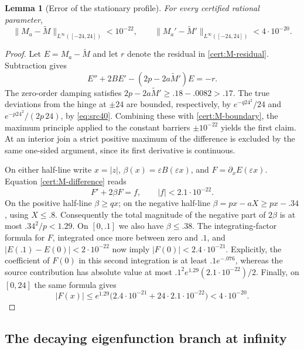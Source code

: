 \documentclass[11pt,a4paper]{article}
\numberwithin{equation}{section}
\newtheorem{lemma}[theorem]{Lemma}
\theoremstyle{definition}
\theoremstyle{remark}
\begin{document}
\begin{lemma}[Error of the stationary profile]\label{cert:M-error}
For every certified rational parameter,
\[
 \|M_a-\widetilde M\|_{L^\infty([-24,24])}<10^{-22},\qquad
 \|M_a'-\widetilde M'\|_{L^\infty([-24,24])}<4\cdot10^{-20}.
\]
\end{lemma}
\begin{proof}
Let $E=M_a-\widetilde M$ and let $r$ denote the residual in
\eqref{cert:M-residual}.  Subtraction gives
\begin{equation}\label{cert:M-difference}
 E''+2B E'-(2p-2a\widetilde M')E=-r.
\end{equation}
The zero-order damping satisfies
$2p-2a\widetilde M'\ge .18-.0082>.17$.
The true deviations from the hinge at $\pm24$ are bounded, respectively, by
$e^{-q24^2}/24$ and $e^{-p24^2}/(2p\,24)$, by
\eqref{eq:src40}.  Combining these with \eqref{cert:M-boundary}, the maximum
principle applied to the constant barriers $\pm10^{-22}$ yields the first
claim.  At an interior join a strict positive maximum of the difference is
excluded by the same one-sided argument, since its first derivative is
continuous.

On either half-line write $x=|z|$, $\beta(x)=\varepsilon B(\varepsilon x)$,
and $F=\partial_xE(\varepsilon x)$.  Equation
\eqref{cert:M-difference} reads
\[
 F'+2\beta F=f,\qquad |f|<2.1\cdot10^{-22}.
\]
On the positive half-line $\beta\ge qx$; on the negative half-line
$\beta=px-aX\ge px-.34$, using $X\le .8$.
Consequently the total magnitude of the negative part of $2\beta$ is at most
$.34^2/p<1.29$.  On $[0,.1]$ we also have $\beta\le .38$.
The integrating-factor formula for $F$, integrated once more between zero and
$.1$, and $|E(.1)-E(0)|<2\cdot10^{-22}$ now imply
$|F(0)|<2.4\cdot10^{-21}$.  Explicitly, the coefficient of $F(0)$ in this
second integration is at least $.1e^{-.076}$, whereas the source contribution
has absolute value at most
$.1^2e^{1.29}(2.1\cdot10^{-22})/2$.
Finally, on $[0,24]$ the same formula gives
\[
 |F(x)|\le e^{1.29}\bigl(2.4\cdot10^{-21}
                      +24\cdot2.1\cdot10^{-22}\bigr)
 <4\cdot10^{-20}.
\]
\end{proof}

\subsection{The decaying eigenfunction branch at infinity}\label{cert:tail}
\end{document}
